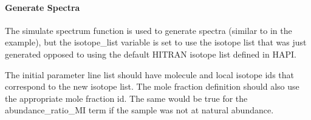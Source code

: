 \documentclass[letterpaper,10pt,english]{sphinxmanual}
\begin{document}
\begin{sphinxVerbatim}[commandchars=\\\{\}]
                                                        
          
                                                      
                                                        
\end{sphinxVerbatim}


\paragraph{Generate Spectra}
\label{\detokenize{Fitting and Simulating isotopes and molecules not in HITRAN:generate-spectra}}
\sphinxAtStartPar
The simulate spectrum function is used to generate spectra (similar to in the {\hyperref[\detokenize{Fitting Synthetic Spectra:fitting-synthetic-spectra}]{}} example), but the isotope\_list variable is set to use the isotope list that was just generated opposed to using the default HITRAN isotope list defined in HAPI.

\sphinxAtStartPar
The initial parameter line list should have molecule and local isotope ids that correspond to the new isotope list.  The mole fraction definition should also use the appropriate mole fraction id.  The same would be true for the abundance\_ratio\_MI term if the sample was not at natural abundance.
\end{document}
